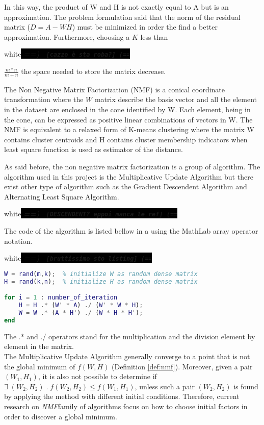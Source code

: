 \documentclass[a4paper,12pt]{article}
\newcommand{\nmf}{\textit{NMF}}
\newcommand{\commento}[1]{\begin{color}{white}\colorbox{black}{
	\textit{\textbf{==) \texttt{ [#1] (==}}}}\end{color}
}
\begin{document}
In this way, the product of W and H is not exactly equal to A but is an approximation. The problem formulation said that the norm of the residual matrix ($D = A - WH$) must be minimized in order the find a better approximation. Furthermore, choosing a $K$ less than \commento{cazzo \`e sta roba?}$\frac{m * n}{m + n} $ the space needed to store the matrix decrease.


The Non Negative Matrix Factorization (NMF) is a conical coordinate transformation\cite{Nikolaus07learningthe} where the $W$ matrix describe the basis vector and all the element in the dataset are enclosed in the cone identified by W. Each element, being in the cone, can be expressed as positive linear combinations of vectors in W. The NMF is equivalent to a relaxed form of K-means clustering where the matrix W contains cluster centroids and H contains cluster membership indicators when least square function is used as estimator of the distance.


As said before, the non negative matrix factorization is a group of algorithm. The algorithm used in this project is the Multiplicative Update Algorithm but there exist other type of algorithm such as the Gradient Descendent Algorithm and Alternating Least Square Algorithm. 
\commento{DESCENDENT? eppoi manca le ref}

The code of the algorithm is listed bellow in a using the MathLab array operator notation.
\commento{bruttissimo sto listing}
\begin{lstlisting}[language=Matlab]
W = rand(m,k);	% initialize W as random dense matrix 
H = rand(k,n);	% initialize H as random dense matrix 

for i = 1 : number_of_iteration
	H = H .* (W' * A) ./ (W' * W * H);
	W = W .* (A * H') ./ (W * H * H');
end
\end{lstlisting}

The .* and ./ operators stand for the multiplication and the division element by element in the matrix. \\

The Multiplicative Update Algorithm generally converge to a point that is not the global minimum of $f(W,H)$ (Definition \ref{def:nmf}).
Moreover, given a pair $(W_1,H_1)$, it is also not possible to determine if $\exists \; (W_2,H_2) \; . \;f(W_2,H_2) \leq f(W_1,H_1)$, unless such a pair $(W_2,H_2)$ is found by applying the method with different initial conditions. 
Therefore, current research on \nmf family of algorithms focus on how to choose initial factors in order to discover a global minimum.
\end{document}
